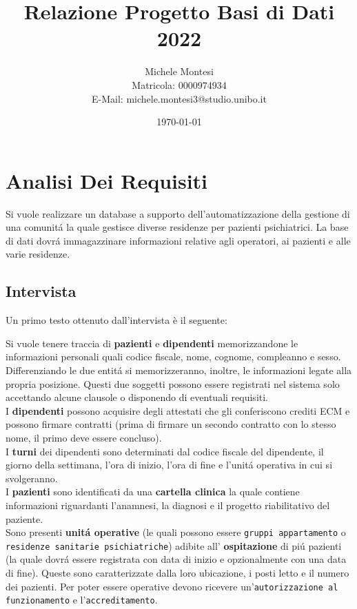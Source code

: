 \documentclass[a4paper, 12pt]{report}
\title{Relazione Progetto Basi di Dati 2022}
\author{Michele Montesi \\
        Matricola: 0000974934 \\
        E-Mail: michele.montesi3@studio.unibo.it}
\date{\today}
\newenvironment{changemargin}[2]{%
  \begin{list}{}{%
    \setlength{\topsep}{0pt}%
    \setlength{\leftmargin}{#1}%
    \setlength{\rightmargin}{#2}%
    \setlength{\listparindent}{\parindent}%
    \setlength{\itemindent}{\parindent}%
    \setlength{\parsep}{\parskip}%
  }%
  \item[]}{\end{list}}
\begin{document}
    
\maketitle
\tableofcontents

\chapter{Analisi Dei Requisiti}
Si vuole realizzare un database a supporto dell'automatizzazione della gestione di una
comunitá la quale gestisce diverse residenze per pazienti psichiatrici.
La base di dati dovrá immagazzinare informazioni relative agli operatori, ai pazienti e
alle varie residenze.

\section{Intervista}
Un primo testo ottenuto dall'intervista è il seguente:

\begin{changemargin}{0.5cm}{0.5cm}
        \noindent
        Si vuole tenere traccia di \textbf{pazienti} e \textbf{dipendenti} memorizzandone le informazioni personali
        quali codice fiscale, nome, cognome, compleanno e sesso. Differenziando le due entitá
        si memorizzeranno, inoltre, le informazioni legate alla propria posizione.
        Questi due soggetti possono essere registrati nel sistema solo accettando alcune clausole o
        disponendo di eventuali requisiti.\\
        I \textbf{dipendenti} possono acquisire degli attestati che gli conferiscono crediti ECM e possono firmare
        contratti (prima di firmare un secondo contratto con lo stesso nome, il primo deve essere concluso).\\
        I \textbf{turni} dei dipendenti sono determinati dal codice fiscale del dipendente, il giorno della settimana, 
        l'ora di inizio, l'ora di fine e l'unitá operativa in cui si svolgeranno.\\
        I \textbf{pazienti} sono identificati da una \textbf{cartella clinica} la quale contiene informazioni riguardanti
        l'anamnesi, la diagnosi e il progetto riabilitativo del paziente.\\
        Sono presenti \textbf{unitá operative} (le quali possono essere \texttt{gruppi appartamento} o \texttt{residenze
        sanitarie psichiatriche}) adibite all' \textbf{ospitazione} di piú pazienti (la quale dovrá essere registrata 
        con data di inizio e opzionalmente con una data di fine). Queste sono caratterizzate dalla loro
        ubicazione, i posti letto e il numero dei pazienti. Per poter essere operative devono ricevere
        un'\texttt{autorizzazione al funzionamento} e l'\texttt{accreditamento}.
\end{changemargin}
\end{document}
